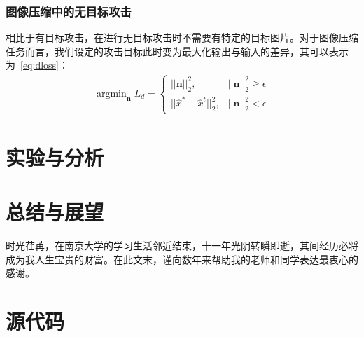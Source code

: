 \documentclass[macfonts,phd,oneside,nobackinfo]{njuthesis}
\begin{document}
\subsection{图像压缩中的无目标攻击}
相比于有目标攻击，在进行无目标攻击时不需要有特定的目标图片。对于图像压缩任务而言，我们设定的攻击目标此时变为最大化输出与输入的差异，其可以表示为~\eqref{eq:dloss}：
\begin{align}
    \mathop{\arg\min}_{\mathbf{n}}{L_{d}} =\left\{ \begin{array}{lc}
        ||\mathbf{n}||_2^2, & ||\mathbf{n}||_2^2 \geq \epsilon \\
        ||\hat{x}^{*}-\hat{x}^{t}||_2^2, & ||\mathbf{n}||_2^2 < \epsilon
    \end{array}
    \right.
    \label{eq:dloss}
\end{align}
\chapter{实验与分析}








\chapter{总结与展望}



\begin{acknowledgement}
时光荏苒，在南京大学的学习生活邻近结束，十一年光阴转瞬即逝，其间经历必将成为我人生宝贵的财富。在此文末，谨向数年来帮助我的老师和同学表达最衷心的感谢。

\end{acknowledgement}








\appendix
\chapter{源代码}\label{app:1}
\end{document}

